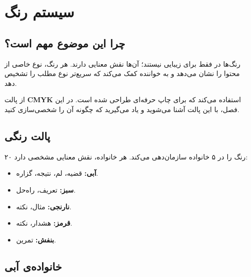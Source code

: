 
\chapter{سیستم رنگ}
\label{chap:colors}

\section{چرا این موضوع مهم است؟}
\label{sec:colors-why}

رنگ‌ها در  فقط برای زیبایی نیستند؛
آن‌ها نقش معنایی دارند. هر رنگ، نوع خاصی از
محتوا را نشان می‌دهد و به خواننده کمک می‌کند
که سریع‌تر نوع مطلب را تشخیص دهد.

 از پالت \textbf{CMYK} استفاده
می‌کند که برای چاپ حرفه‌ای طراحی شده است. در
این فصل، با این پالت آشنا می‌شوید و یاد
می‌گیرید که چگونه آن را شخصی‌سازی کنید.


\section{پالت رنگی }
\label{sec:colors-palette}

 ۲۰ رنگ را در ۵ خانواده سازمان‌دهی
می‌کند. هر خانواده، نقش معنایی مشخصی دارد:

\begin{itemize}
    \item \textbf{آبی:} قضیه، لم، نتیجه، گزاره.
    \item \textbf{سبز:} تعریف، راه‌حل.
    \item \textbf{نارنجی:} مثال، نکته.
    \item \textbf{قرمز:} هشدار، نکته.
    \item \textbf{بنفش:} تمرین.
\end{itemize}


\section{خانواده‌ی آبی}
\label{sec:colors-blue}

